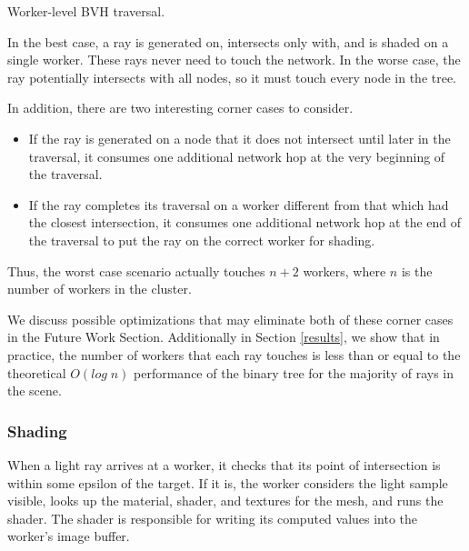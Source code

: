 \documentclass[a4paper,twoside]{article}
\begin{document}
\begin{algorithm}
    \SetAlgoLined


    \caption{Worker-level BVH traversal.}
    \label{algo:workerlevel}
\end{algorithm}

In the best case, a ray is generated on, intersects only with, and is shaded on
a single worker. These rays never need to touch the network. In the worse case,
the ray potentially intersects with all nodes, so it must touch every node in
the tree.

In addition, there are two interesting corner cases to consider.

\begin{itemize}
    \item If the ray is generated on a node that it does not intersect until
        later in the traversal, it consumes one additional network hop at the
        very beginning of the traversal.
    \item If the ray completes its traversal on a worker different from that
        which had the closest intersection, it consumes one additional network
        hop at the end of the traversal to put the ray on the correct worker for
        shading.
\end{itemize}

Thus, the worst case scenario actually touches $n + 2$ workers, where $n$ is the
number of workers in the cluster.

We discuss possible optimizations that may eliminate
both of these corner cases in the Future Work Section. Additionally in Section \ref{results}, we show that
in practice, the number of workers that each ray touches is less than or equal
to the theoretical $O(log\;n)$ performance of the binary tree for the majority
of rays in the scene.

\subsubsection{Shading}
\label{shading}

When a light ray arrives at a worker, it checks that its point of intersection
is within some epsilon of the target. If it is, the worker considers the light sample
visible, looks up the material, shader, and textures for the mesh, and runs the
shader. The shader is responsible for writing its computed values into the
worker's image buffer.
\end{document}
